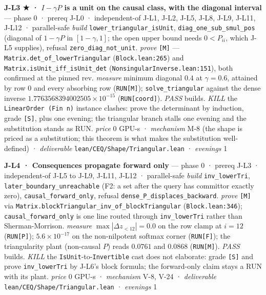 \documentclass[11pt,a4paper]{article}
\theoremstyle{plain}
\theoremstyle{definition}
\theoremstyle{remark}
\begin{document}
\textbf{J-L3 ★ · \(I-\gamma P\) is a unit on the causal class, with the
diagonal interval} --- phase 0 · prereq J-L0 · independent-of J-L1,
J-L2, J-L5, J-L8, J-L9, J-L11, J-L12 · parallel-safe \emph{build}
\texttt{lower\_triangular\_isUnit}, \texttt{diag\_one\_sub\_smul\_pos}
(diagonal of \(1-\gamma P\) in \([1-\gamma,1]\); the open upper bound
needs \(0<P_{ii}\), which J-L5 supplies), refusal
\texttt{zero\_diag\_not\_unit}. \emph{prove} \texttt{{[}M{]}} ---
\texttt{Matrix.det\_of\_lowerTriangular} (\texttt{Block.lean:265}) and
\texttt{Matrix.isUnit\_iff\_isUnit\_det}
(\texttt{NonsingularInverse.lean:151}), both confirmed at the pinned
rev. \emph{measure} minimum diagonal \(0.4\) at \(\gamma=0.6\), attained
by row 0 and every absorbing row (\texttt{RUN{[}M{]}});
\texttt{solve\_triangular} against the dense inverse
\(1.7763568394002505\times10^{-15}\) (\texttt{RUN{[}coord{]}}).
\emph{PASS} builds. \emph{KILL} the \texttt{LinearOrder\ (Fin\ n)}
instance clashes: prove the determinant by induction, grade
\texttt{{[}S{]}}, plus one evening; the triangular branch stalls one
evening and the substitution stands as RUN. \emph{price} \(0\) GPU-s ·
\emph{mechanism} M-8 (the shape is priced as a substitution; this
theorem is what makes the substitution well-defined) ·
\emph{deliverable} \texttt{lean/CEQ/Shape/Triangular.lean} ·
\emph{evenings} 1

\textbf{J-L4 · Consequences propagate forward only} --- phase 0 · prereq
J-L3 · independent-of J-L5 to J-L9, J-L11, J-L12 · parallel-safe
\emph{build} \texttt{inv\_lowerTri},
\texttt{later\_boundary\_unreachable} (F2: a set after the query has
committor exactly zero), \texttt{causal\_forward\_only}, refusal
\texttt{dense\_P\_displaces\_backward}. \emph{prove} \texttt{{[}M{]}}
via \texttt{Matrix.blockTriangular\_inv\_of\_blockTriangular}
(\texttt{Block.lean:346}); \texttt{causal\_forward\_only} is one line
routed through \texttt{inv\_lowerTri} rather than Sherman-Morrison.
\emph{measure} \(\max|\Delta z_{<12}|=0.0\) on the row clamp at \(i=12\)
(\texttt{RUN{[}P{]}}); \(5.6\times10^{-17}\) on the non-nilpotent
softmax corner (\texttt{RUN{[}F{]}}); the triangularity plant
(non-causal \(P\)) reads \(0.0761\) and \(0.0868\)
(\texttt{RUN{[}M{]}}). \emph{PASS} builds. \emph{KILL} the
\texttt{IsUnit}-to-\texttt{Invertible} cast does not elaborate: grade
\texttt{{[}S{]}} and prove \texttt{inv\_lowerTri} by J-L6's block
formula; the forward-only claim stays a RUN with its plant. \emph{price}
\(0\) GPU-s · \emph{mechanism} V-8, V-24 · \emph{deliverable}
\texttt{lean/CEQ/Shape/Triangular.lean} · \emph{evenings} 1
\end{document}
